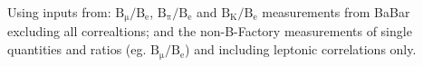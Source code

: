 \noindent Using inputs from: $\mathrm{B_\mu/B_e}$,  $\mathrm{B_\pi/B_e}$ and $\mathrm{B_K/B_e}$ measurements from BaBar excluding all correaltions; and the non-B-Factory measurements of single quantities and ratios (eg. $\mathrm{B_\mu/B_e}$) and including leptonic correlations only.
